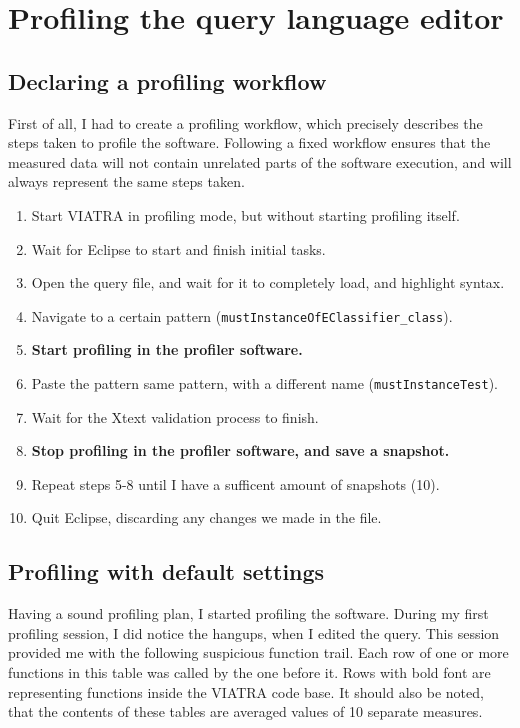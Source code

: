 \documentclass[11pt,a4paper,oneside]{report}
\begin{document}
\section{Profiling the query language editor}
\subsection{Declaring a profiling workflow}
First of all, I had to create a profiling workflow, which precisely describes
the steps taken to profile the software. Following a fixed workflow ensures that
the measured data will not contain unrelated parts of the software execution,
and will always represent the same steps taken.

\begin{enumerate}
    \item{Start VIATRA in profiling mode, but without starting profiling itself.}
    \item{Wait for Eclipse to start and finish initial tasks.}
    \item{Open the query file, and wait for it to completely load, and highlight syntax.}
    \item{Navigate to a certain pattern (\texttt{mustInstanceOfEClassifier\_class}).}
    \item{\textbf{Start profiling in the profiler software.}}
    \item{Paste the pattern same pattern, with a different name (\texttt{mustInstanceTest}).}
    \item{Wait for the Xtext validation process to finish.}
    \item{\textbf{Stop profiling in the profiler software, and save a snapshot.}}
    \item{Repeat steps 5-8 until I have a sufficent amount of snapshots (10).}
    \item{Quit Eclipse, discarding any changes we made in the file.}
\end{enumerate}

\subsection{Profiling with default settings}
Having a sound profiling plan, I started profiling the software. During my
first profiling session, I did notice the hangups, when I edited the query. This
session provided me with the following suspicious function trail. Each row of
one or more functions in this table was called by the one before it. Rows with
bold font are representing functions inside the VIATRA code base. It should also
be noted, that the contents of these tables are averaged values of 10 separate
measures.
\end{document}
